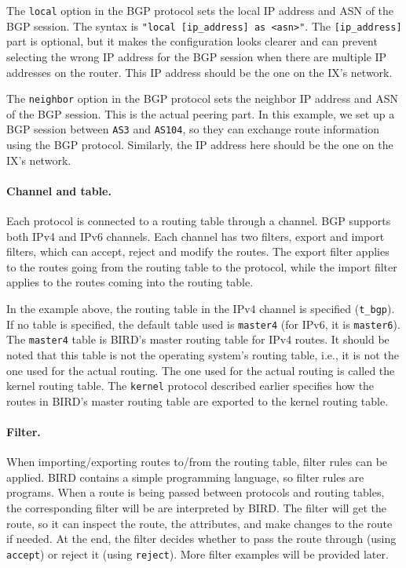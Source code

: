 The \texttt{local} option in the BGP protocol sets the local IP address and ASN of the BGP session.
The syntax is \texttt{"local [ip\_address] as <asn>"}. The \texttt{[ip\_address]} part is optional,
but it makes the configuration looks clearer and can prevent selecting the wrong IP address for the
BGP session when there are multiple IP addresses on the router. This
IP address should be the one on the IX's network.

The \texttt{neighbor} option in the BGP protocol sets the neighbor IP address and ASN of the BGP
session. This is the actual peering part. In this example, we set up a BGP session
between \texttt{AS3} and \texttt{AS104}, so they can exchange route information using the BGP protocol.
Similarly, the IP address here should be the one on the IX's network.


\paragraph{Channel and table.}
Each protocol is connected to a routing table through a channel. 
BGP supports both IPv4 and IPv6 channels. 
Each channel has two filters, export and import filters, 
which can accept, reject and modify the routes. 
The export filter applies to the routes going from the routing table to the protocol, 
while the import filter applies to the routes coming into the routing table. 

In the example above, the routing table in the IPv4 channel is 
specified (\texttt{t\_bgp}). If no table is specified, the 
default table used is \texttt{master4} (for IPv6, it is \texttt{master6}). The 
\texttt{master4} table is BIRD's master routing table for IPv4 routes. It should 
be noted that this table is not the operating system's routing table, i.e.,
it is not the one used for the actual routing. The one used for the actual
routing is called the kernel routing table. The \texttt{kernel} protocol
described earlier specifies how the routes in  BIRD's master routing
table are exported to the kernel routing table. 

\paragraph{Filter.}
When importing/exporting routes to/from the routing table, 
filter rules can be applied. BIRD contains a simple programming language,
so filter rules are programs.
When a route is being passed between protocols and routing tables, 
the corresponding filter will be are interpreted by BIRD.
The filter will get the route, so it can inspect the route,
the attributes, and make changes to the route if needed. 
At the end, the filter decides
whether to pass the route through (using \texttt{accept}) 
or reject it (using \texttt{reject}). 
More filter examples will be provided later.



